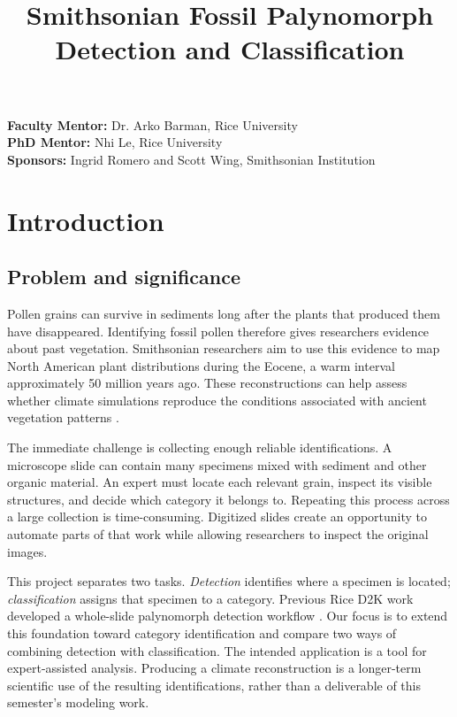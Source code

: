 \documentclass[conference,letterpaper]{IEEEtran}
\title{Smithsonian Fossil Palynomorph Detection and Classification}
\author{\IEEEauthorblockN{Patrick Batsell, Yun Ying Tsai, Yeonju Kim, Yunfan Bao, and Alan Yang}
\IEEEauthorblockA{Rice University\\
Applied Machine Learning \& Data Science Projects\\
DSCI 435/535 \& COMP 449/549}}
\begin{document}
\onecolumn
\maketitle
\thispagestyle{plain}
\pagestyle{plain}
\begin{center}
\textbf{Faculty Mentor:} Dr. Arko Barman, Rice University\\[3pt]
\textbf{PhD Mentor:} Nhi Le, Rice University\\[3pt]
\textbf{Sponsors:} Ingrid Romero and Scott Wing, Smithsonian Institution
\end{center}
\tableofcontents
\clearpage
\twocolumn

\section{Introduction}
\subsection{Problem and significance}
Pollen grains can survive in sediments long after the plants that produced them have disappeared. Identifying fossil pollen therefore gives researchers evidence about past vegetation. Smithsonian researchers aim to use this evidence to map North American plant distributions during the Eocene, a warm interval approximately 50 million years ago. These reconstructions can help assess whether climate simulations reproduce the conditions associated with ancient vegetation patterns \cite{proposal2026}.

The immediate challenge is collecting enough reliable identifications. A microscope slide can contain many specimens mixed with sediment and other organic material. An expert must locate each relevant grain, inspect its visible structures, and decide which category it belongs to. Repeating this process across a large collection is time-consuming. Digitized slides create an opportunity to automate parts of that work while allowing researchers to inspect the original images.

This project separates two tasks. \emph{Detection} identifies where a specimen is located; \emph{classification} assigns that specimen to a category. Previous Rice D2K work developed a whole-slide palynomorph detection workflow \cite{shaikh2026}. Our focus is to extend this foundation toward category identification and compare two ways of combining detection with classification. The intended application is a tool for expert-assisted analysis. Producing a climate reconstruction is a longer-term scientific use of the resulting identifications, rather than a deliverable of this semester's modeling work.
\end{document}
